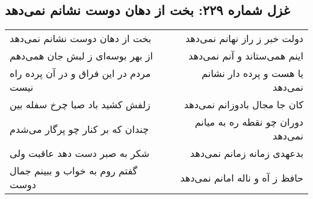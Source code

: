 \begin{center}
\section*{غزل شماره ۲۲۹: بخت از دهان دوست نشانم نمی‌دهد}
\label{sec:sh229}
\begin{longtable}{l p{0.5cm} r}
بخت از دهان دوست نشانم نمی‌دهد
&&
دولت خبر ز راز نهانم نمی‌دهد
\\
از بهر بوسه‌ای ز لبش جان همی‌دهم
&&
اینم همی‌ستاند و آنم نمی‌دهد
\\
مردم در این فراق و در آن پرده راه نیست
&&
یا هست و پرده دار نشانم نمی‌دهد
\\
زلفش کشید باد صبا چرخ سفله بین
&&
کان جا مجال بادوزانم نمی‌دهد
\\
چندان که بر کنار چو پرگار می‌شدم
&&
دوران چو نقطه ره به میانم نمی‌دهد
\\
شکر به صبر دست دهد عاقبت ولی
&&
بدعهدی زمانه زمانم نمی‌دهد
\\
گفتم روم به خواب و ببینم جمال دوست
&&
حافظ ز آه و ناله امانم نمی‌دهد
\\
\end{longtable}
\end{center}
